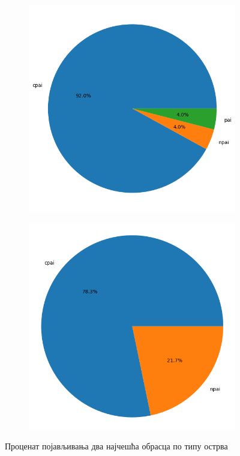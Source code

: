 \documentclass[12pt]{article}
\begin{document}
\begin{figure}[htbp]
    \centering
    \begin{subfigure}{0.48\linewidth}
        \centering
        \includegraphics[width=\linewidth]{images/top_1_by_islands.png}
    \end{subfigure}
    \begin{subfigure}{0.48\linewidth}
        \centering
        \includegraphics[width=\linewidth]{images/top_2_by_islands.png}
    \end{subfigure}
    \caption{Проценат појављивања два најчешћа обрасца по типу острва}
\end{figure}


\newpage

\end{document}
